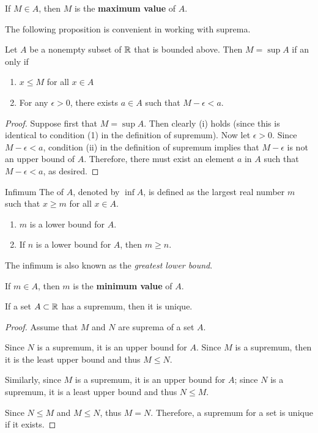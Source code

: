 \begin{remark}
If $M \in A$, then $M$ is the \textbf{maximum value} of $A$.
\end{remark}

The following proposition is convenient in working with suprema.
\begin{proposition}
Let $A$ be a nonempty subset of $\mathbb R$ that is bounded above. Then  $M = \sup A$ if an only if
\begin{enumerate}[label=(\roman*)]
\item $x \le M$ for all $x \in A$
\item For any $\epsilon>0$, there exists $a \in A$ such that $M - \epsilon < a$.
\end{enumerate}
\end{proposition}
\begin{proof}
Suppose first that $M=\sup A$. Then clearly (i) holds (since this is identical to condition (1) in the definition of supremum). Now let $\epsilon>0$. Since $M-\epsilon<a$, condition (ii) in the definition of supremum implies that $M-\epsilon$ is not an upper bound of $A$. Therefore, there must exist an element $a$ in $A$ such that $M-\epsilon<a$, as desired.
\end{proof}

\begin{defn}{Infimum}{}
The  of $A$, denoted by $\inf A$, is defined as the largest real number $m$ such that $x \ge m$ for all $x\in A$.
\begin{enumerate}[label=(\roman*)]
\item $m$ is a lower bound for $A$.
\item If $n$ is a lower bound for $A$, then $m \ge n$.
\end{enumerate}
The infimum is also known as the \emph{greatest lower bound}.
\end{defn}

\begin{remark}
If $m \in A$, then $m$ is the \textbf{minimum value} of $A$.
\end{remark}

\begin{proposition}
If a set $A \subset \mathbb R$ has a supremum, then it is unique.
\end{proposition}

\begin{proof}
Assume that $M$ and $N$ are suprema of a set $A$.

Since $N$ is a supremum, it is an upper bound for $A$. Since $M$ is a supremum, then it is the least upper bound and thus $M \le N$. 

Similarly, since $M$ is a supremum, it is an upper bound for $A$; since $N$ is a supremum, it is a least upper bound and thus $N \le M$. 

Since $N \le M$ and $M \le N$, thus $M = N$. Therefore, a supremum for a set is unique if it exists.
\end{proof}


